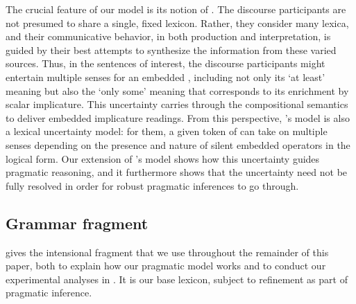 \documentclass[leqno,12pt]{article}
\begin{document}
The crucial feature of our model is its notion of . The discourse participants are not presumed to share a
single, fixed lexicon. Rather, they consider many lexica, and their
communicative behavior, in both production and interpretation, is
guided by their best attempts to synthesize the information from these
varied sources. Thus, in the sentences of interest, the discourse
participants might entertain multiple senses for an embedded
, including not only its `at least' meaning but also the
`only some' meaning that corresponds to its enrichment by scalar
implicature. This uncertainty carries through the compositional
semantics to deliver embedded implicature readings. From this
perspective, \citeauthor{ChierchiaFoxSpector08}'s model is also a
lexical uncertainty model: for them, a given token of  can
take on multiple senses depending on the presence and nature of silent
embedded operators in the logical form. Our extension of
\citeauthor{Bergen:Levy:Goodman:2014}'s model shows how this
uncertainty guides pragmatic reasoning, and it furthermore shows that
the uncertainty need not be fully resolved in order for robust
pragmatic inferences to go through.



\subsection{Grammar fragment}\label{sec:grammar}


 gives the intensional fragment that we use
throughout the remainder of this paper, both to explain how our
pragmatic model works and to conduct our experimental analyses in
. It is our base lexicon, subject to refinement as
part of pragmatic inference.
\end{document}
